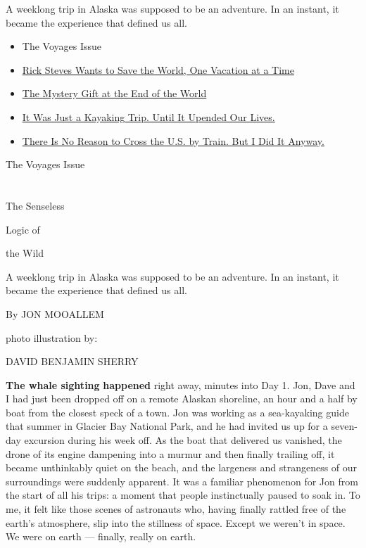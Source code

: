 A weeklong trip in Alaska was supposed to be an adventure. In an
instant, it became the experience that defined us all.

\begin{itemize}
\tightlist
\item
  The Voyages Issue
\item
  \href{https://www.nytimes3xbfgragh.onion/interactive/2019/03/20/magazine/rick-steves-travel-world.html}{Rick
  Steves Wants to Save the World, One Vacation at a Time}
\item
  \href{https://www.nytimes3xbfgragh.onion/interactive/2019/03/21/magazine/mushrooms-sweden-island.html}{The
  Mystery Gift at the End of the World}
\item
  \href{https://www.nytimes3xbfgragh.onion/interactive/2019/03/20/magazine/kayaking-trip-alaska.html}{It
  Was Just a Kayaking Trip. Until It Upended Our Lives.}
\item
  \href{https://www.nytimes3xbfgragh.onion/interactive/2019/03/20/magazine/train-across-america-amtrak.html}{There
  Is No Reason to Cross the U.S. by Train. But I Did It Anyway.}
\end{itemize}

The Voyages Issue

\section{}

The Senseless

Logic of

the Wild

 A weeklong trip in Alaska was supposed to be an adventure. In an
instant, it became the experience that defined us all.

By JON MOOALLEM

photo illustration by:

DAVID BENJAMIN SHERRY

\textbf{The whale sighting} \textbf{happened} right away, minutes into
Day 1. Jon, Dave and I had just been dropped off on a remote Alaskan
shoreline, an hour and a half by boat from the closest speck of a town.
Jon was working as a sea-kayaking guide that summer in Glacier Bay
National Park, and he had invited us up for a seven-day excursion during
his week off. As the boat that delivered us vanished, the drone of its
engine dampening into a murmur and then finally trailing off, it became
unthinkably quiet on the beach, and the largeness and strangeness of our
surroundings were suddenly apparent. It was a familiar phenomenon for
Jon from the start of all his trips: a moment that people instinctually
paused to soak in. To me, it felt like those scenes of astronauts who,
having finally rattled free of the earth's atmosphere, slip into the
stillness of space. Except we weren't in space. We were on earth ---
finally, really on earth.

